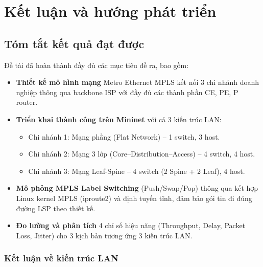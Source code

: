 \chapter{Kết luận và hướng phát triển}

\section{Tóm tắt kết quả đạt được}

Đề tài đã hoàn thành đầy đủ các mục tiêu đề ra, bao gồm:

\begin{itemize}
    \item \textbf{Thiết kế mô hình mạng} Metro Ethernet MPLS kết nối 3 chi nhánh doanh nghiệp thông qua backbone ISP với đầy đủ các thành phần CE, PE, P router.

    \item \textbf{Triển khai thành công trên Mininet} với cả 3 kiến trúc LAN:
    \begin{itemize}
        \item Chi nhánh 1: Mạng phẳng (Flat Network) – 1 switch, 3 host.
        \item Chi nhánh 2: Mạng 3 lớp (Core–Distribution–Access) – 4 switch, 4 host.
        \item Chi nhánh 3: Mạng Leaf-Spine – 4 switch (2 Spine + 2 Leaf), 4 host.
    \end{itemize}

    \item \textbf{Mô phỏng MPLS Label Switching} (Push/Swap/Pop) thông qua kết hợp Linux kernel MPLS (iproute2) và định tuyến tĩnh, đảm bảo gói tin đi đúng đường LSP theo thiết kế.

    \item \textbf{Đo lường và phân tích} 4 chỉ số hiệu năng (Throughput, Delay, Packet Loss, Jitter) cho 3 kịch bản tương ứng 3 kiến trúc LAN.
\end{itemize}

\subsection{Kết luận về kiến trúc LAN}

